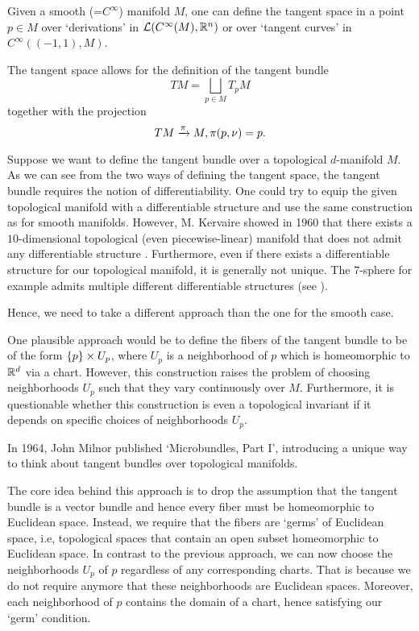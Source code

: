 \begin{myparagraph}
Given a smooth (=$C^\infty$) manifold $M$, one can define the tangent space in a point $p \in M$ over `derivations' in $\mathcal{L}(C^\infty(M), \mathbb{R}^n)$ or over `tangent curves' in $C^\infty((-1, 1), M)$.

The tangent space allows for the definition of the tangent bundle \[ TM = \bigsqcup_{p \in M} T_p M\] together with the projection \[ TM \xrightarrow{\pi} M, \pi(p, \nu) = p. \]

Suppose we want to define the tangent bundle over a topological $d$-manifold $M$. As we can see from the two ways of defining the tangent space, the tangent bundle requires the notion of differentiability. One could try to equip the given topological manifold with a differentiable structure and use the same construction as for smooth manifolds. However, M. Kervaire showed in 1960 that there exists a $10$-dimensional topological (even piecewise-linear) manifold that does not admit any differentiable structure \cite{kervaire}. Furthermore, even if there exists a differentiable structure for our topological manifold, it is generally not unique. The $7$-sphere for example admits multiple different differentiable structures (see \cite{milnor7sphere}).

Hence, we need to take a different approach than the one for the smooth case.

One plausible approach would be to define the fibers of the tangent bundle to be of the form $\{p\} \times U_p$, where $U_p$ is a neighborhood of $p$ which is homeomorphic to $\mathbb{R}^d$ via a chart. However, this construction raises the problem of choosing neighborhoods $U_p$ such that they vary continuously over $M$. Furthermore, it is questionable whether this construction is even a topological invariant if it depends on specific choices of neighborhoods $U_p$.

In 1964, John Milnor published `Microbundles, Part I', introducing a unique way to think about tangent bundles over topological manifolds.

The core idea behind this approach is to drop the assumption that the tangent bundle is a vector bundle and hence every fiber must be homeomorphic to Euclidean space. Instead, we require that the fibers are `germs' of Euclidean space, i.e, topological spaces that contain an open subset homeomorphic to Euclidean space. In contrast to the previous approach, we can now choose the neighborhoods $U_p$ of $p$ regardless of any corresponding charts. That is because we do not require anymore that these neighborhoods are Euclidean spaces. Moreover, each neighborhood of $p$ contains the domain of a chart, hence satisfying our `germ' condition.


\end{myparagraph}
